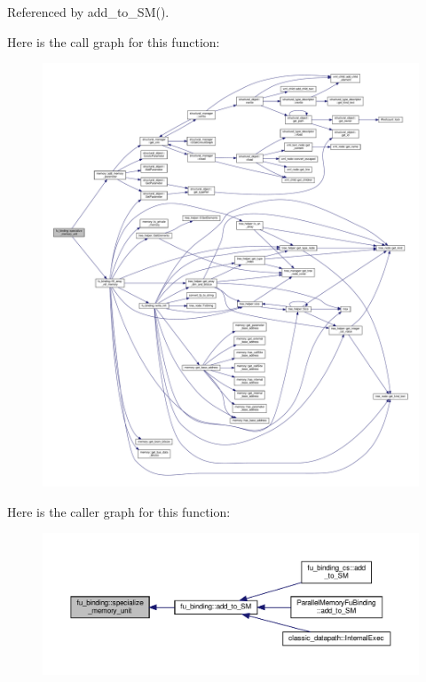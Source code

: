 Referenced by add\+\_\+to\+\_\+\+S\+M().

Here is the call graph for this function\+:
\nopagebreak
\begin{figure}[H]
\begin{center}
\leavevmode
\includegraphics[width=350pt]{d8/d04/classfu__binding_a9b6236984045631086c488e5cc127902_cgraph}
\end{center}
\end{figure}
Here is the caller graph for this function\+:
\nopagebreak
\begin{figure}[H]
\begin{center}
\leavevmode
\includegraphics[width=350pt]{d8/d04/classfu__binding_a9b6236984045631086c488e5cc127902_icgraph}
\end{center}
\end{figure}
\mbox{\label{classfu__binding_ae411f4781db5b250a15b49f562290b3e}} 
